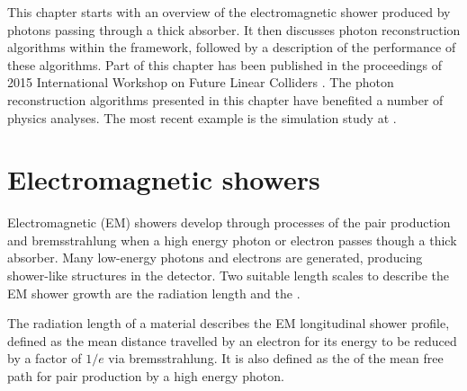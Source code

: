 This chapter starts with an overview of the electromagnetic shower produced by photons passing through a thick absorber. It then discusses photon reconstruction algorithms within the \pandora framework, followed by a description of the performance of these algorithms.  Part of this chapter has been published in the proceedings of 2015 International Workshop on Future Linear Colliders \cite{Xu:2016rcz}. The photon reconstruction algorithms presented in this chapter have benefited a number of physics analyses. The most recent example  is the  \HepProcess{\PHiggs \to \Pgamma \Pgamma} simulation study at  \CLIC \cite{Kacarevic:higgsToGammaGamma}.





\section{Electromagnetic showers}
\label{sec:photonEMshower}
Electromagnetic (EM) showers develop through processes of the pair production and bremsstrahlung when a high energy photon or electron passes though a thick absorber. Many low-energy photons and electrons are generated, producing shower-like  structures in the detector. Two suitable length scales to describe the EM shower growth are the radiation length and the \RM \cite{PhysRev.149.201,Bathow:1970dn}.

The radiation length of a material describes the EM longitudinal  shower profile, defined as the mean distance travelled by an electron for  its energy to be reduced by a factor of $1/e$ via bremsstrahlung. It is also defined as the  of the mean free path  for pair production by a high energy photon\cite{segre1977nuclei}.


